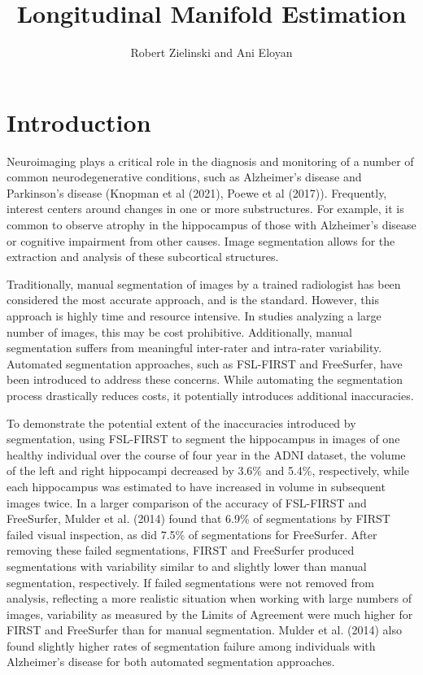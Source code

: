 \documentclass[11pt,reqno]{article}
\begin{document}
\title{Longitudinal Manifold Estimation}
\author[1]{Robert Zielinski and Ani Eloyan}


\maketitle

\section{Introduction}

Neuroimaging plays a critical role in the diagnosis and monitoring of a number of common neurodegenerative conditions, such as Alzheimer's disease and Parkinson's disease (Knopman et al (2021), Poewe et al (2017)). Frequently, interest centers around changes in one or more substructures. For example, it is common to observe atrophy in the hippocampus of those with Alzheimer's disease or cognitive impairment from other causes. Image segmentation allows for the extraction and analysis of these subcortical structures.

Traditionally, manual segmentation of images by a trained radiologist has been considered the most accurate approach, and is the standard. However, this approach is highly time and resource intensive. In studies analyzing a large number of images, this may be cost prohibitive. Additionally, manual segmentation suffers from meaningful inter-rater and intra-rater variability. Automated segmentation approaches, such as FSL-FIRST and FreeSurfer, have been introduced to address these concerns. While automating the segmentation process drastically reduces costs, it potentially introduces additional inaccuracies. 

To demonstrate the potential extent of the inaccuracies introduced by segmentation, using FSL-FIRST to segment the hippocampus in images of one healthy individual over the course of four year in the ADNI dataset, the volume of the left and right hippocampi decreased by 3.6\% and 5.4\%, respectively, while each hippocampus was estimated to have increased in volume in subsequent images twice. In a larger comparison of the accuracy of FSL-FIRST and FreeSurfer, Mulder et al. (2014) found that 6.9\% of segmentations by FIRST failed visual inspection, as did 7.5\% of segmentations for FreeSurfer. After removing these failed segmentations, FIRST and FreeSurfer produced segmentations with variability similar to and slightly lower than manual segmentation, respectively. If failed segmentations were not removed from analysis, reflecting a more realistic situation when working with large numbers of images, variability as measured by the Limits of Agreement were much higher for FIRST and FreeSurfer than for manual segmentation. Mulder et al. (2014) also found slightly higher rates of segmentation failure among individuals with Alzheimer's disease for both automated segmentation approaches.
\end{document}
